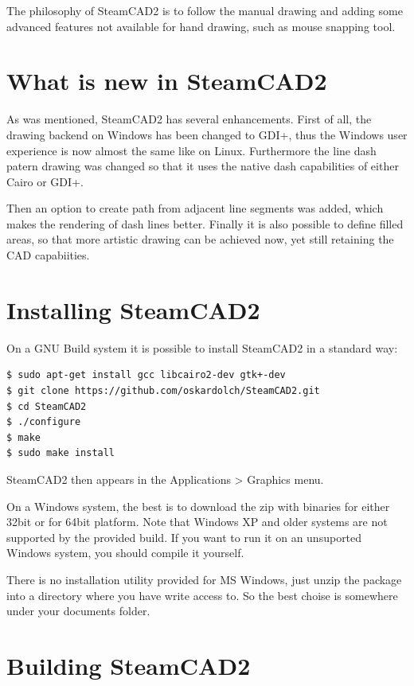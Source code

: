 The philosophy of SteamCAD2 is to follow the manual drawing and adding some advanced features
not available for hand drawing, such as mouse snapping tool.

\section{What is new in SteamCAD2}

As was mentioned, SteamCAD2 has several enhancements. First of all, the drawing backend on Windows
has been changed to GDI+, thus the Windows user experience is now almost the same like on Linux.
Furthermore the line dash patern drawing was changed so that it uses the native dash capabilities
of either Cairo or GDI+.

Then an option to create path from adjacent line segments was added, which makes the rendering
of dash lines better. Finally it is also possible to define filled areas, so that more artistic
drawing can be achieved now, yet still retaining the CAD capabiities.

\section{Installing SteamCAD2}

On a GNU Build system it is possible to install SteamCAD2 in a standard way:
\begin{verbatim}
$ sudo apt-get install gcc libcairo2-dev gtk+-dev
$ git clone https://github.com/oskardolch/SteamCAD2.git
$ cd SteamCAD2
$ ./configure
$ make
$ sudo make install
\end{verbatim}

SteamCAD2 then appears in the Applications > Graphics menu.

On a Windows system, the best is to download the zip with binaries for either 32bit or for 64bit
platform. Note that Windows XP and older systems are not supported by the provided build. If
you want to run it on an unsuported Windows system, you should compile it yourself.

There is no installation utility provided for MS Windows, just unzip the package into a directory
where you have write access to. So the best choise is somewhere under your documents folder.

\section{Building SteamCAD2}

